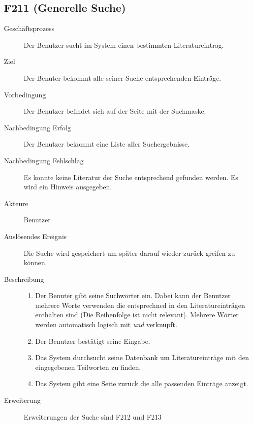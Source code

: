 \subsection{F211 (Generelle Suche)}
\begin{description}
  \item[Geschäftsprozess]Der Benutzer sucht im System einen bestimmten Literatureintrag.
  \item[Ziel]Der Benuter bekommt alle seiner Suche entsprechenden Einträge.
  \item[Vorbedingung]Der Benutzer befindet sich auf der Seite mit der Suchmaske.
  \item[Nachbedingung Erfolg]Der Benutzer bekommt eine Liste aller Suchergebnisse.
  \item[Nachbedingung Fehlschlag]Es konnte keine Literatur der Suche entsprechend gefunden werden. Es wird ein Hinweis ausgegeben.
  \item[Akteure]Benutzer
  \item[Auslösendes Ereignis]Die Suche wird gespeichert um später darauf wieder zurück greifen zu können.
  \item[Beschreibung]
    \begin{enumerate}
      \item Der Benuter gibt seine Suchwörter ein. Dabei kann der Benutzer mehrere Worte verwenden die entsprechned in den Literatureinträgen enthalten sind (Die Reihenfolge ist nicht relevant). Mehrere Wörter werden automatisch logisch mit \emph{und} verknüpft.
      \item Der Benutzer bestätigt seine Eingabe.
      \item Das System durchsucht seine Datenbank um Literatureinträge mit den eingegebenen Teilworten zu finden.
      \item Das System gibt eine Seite zurück die alle passenden Einträge anzeigt.
    \end{enumerate}
    \item[Erweiterung]Erweiterungen der Suche sind F212 und F213
\end{description}


